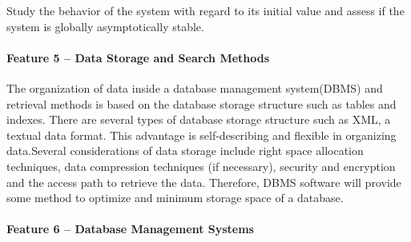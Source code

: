\documentclass[a4paper]{article} %
\begin{document}
	Study the behavior of the system with regard to its initial value and assess if the system is globally asymptotically stable.
	
	\paragraph*{Feature 5 -- Data Storage and Search Methods}
	\label{task1:feature5}
	
	The organization of data inside a database management system(DBMS) and retrieval methods is based on the database storage structure such as tables and indexes. 
	There are several types of database storage structure such as XML, a textual data format. 
	This advantage is self-describing and flexible in organizing data.\cite{ISI:000253400700005}Several considerations of data storage include right space allocation techniques, data compression techniques (if necessary), security and encryption and the access path to retrieve the data. 
	Therefore, DBMS software will provide some method to optimize and  minimum storage space of a database.
	
	\paragraph*{Feature 6 -- Database Management Systems}
	\label{task1:feature6}
	
\end{document}
